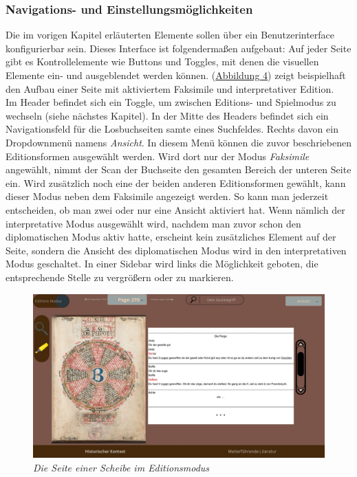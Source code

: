 \documentclass[12pt,a4paper]{article}
\begin{document}
		\subsubsection{Navigations- und Einstellungsmöglichkeiten}
		Die im vorigen Kapitel erläuterten Elemente sollen über ein Benutzerinterface konfigurierbar sein. 
		Dieses Interface ist folgendermaßen aufgebaut: Auf jeder Seite gibt es Kontrollelemente wie Buttons und Toggles, 
		mit denen die visuellen Elemente ein- und ausgeblendet werden können. (\hyperref[Abbildung4]{Abbildung 4}) zeigt beispielhaft den Aufbau einer Seite mit 
		aktiviertem Faksimile und interpretativer Edition.\\
		Im Header befindet sich ein Toggle, um zwischen Editions- und Spielmodus zu wechseln (siehe nächstes Kapitel). 
		In der Mitte des Headers befindet sich ein Navigationsfeld für die Losbuchseiten samte eines Suchfeldes. Rechts 
		davon ein Dropdownmenü namens \textit{Ansicht}. In diesem Menü können die zuvor beschriebenen Editionsformen ausgewählt werden. 
		Wird dort nur der Modus \textit{Faksimile} angewählt, nimmt der Scan der Buchseite den gesamten Bereich der unteren Seite ein. 
		Wird zusätzlich noch eine der beiden anderen Editionsformen gewählt, kann dieser Modus neben dem Faksimile angezeigt werden. 
		So kann man jederzeit entscheiden, ob man zwei oder nur eine Ansicht aktiviert hat. Wenn nämlich der interpretative Modus ausgewählt wird,
		nachdem man zuvor schon den diplomatischen Modus aktiv hatte, erscheint kein zusätzliches Element auf der Seite, sondern die Ansicht des diplomatischen 
		Modus wird in den interpretativen Modus geschaltet. In einer Sidebar wird links die Möglichkeit geboten, die entsprechende Stelle zu vergrößern oder zu markieren.
			\begin{figure}[htbp]
				\centering
				\includegraphics[scale=0.3]{ansicht-startseite-editionsmodus.JPG}
				\caption{\textit{Die Seite einer Scheibe im Editionsmodus}}
				\label{Abbildung4}
			\end{figure}
\end{document}
